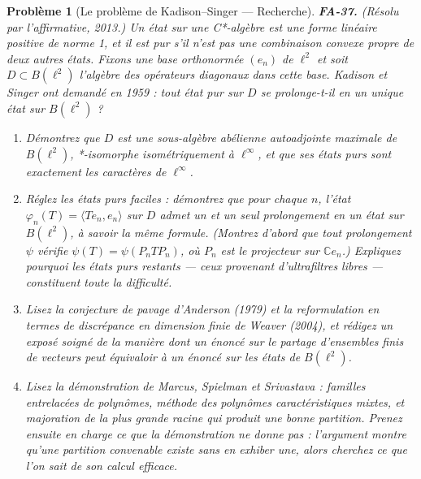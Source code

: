 \documentclass[11pt]{article}
\newtheorem{problem}{Problème}
\begin{document}
\bigskip

\begin{problem}[{Le problème de Kadison--Singer --- Recherche}]
\textbf{FA-37.} (Résolu par l'affirmative, 2013.) Un \textit{état} sur une C*-algèbre est une forme
linéaire positive de norme 1, et il est \textit{pur} s'il n'est pas une combinaison convexe propre de deux
autres états. Fixons une base orthonormée $ (e_n) $ de $ \ell^2 $ et soit $ D \subset B(\ell^2) $
l'algèbre des opérateurs diagonaux dans cette base. Kadison et Singer ont demandé en 1959 : tout état pur
sur $ D $ se prolonge-t-il en un \textit{unique} état sur $ B(\ell^2) $ ?
\begin{enumerate}
\item[(a)] Démontrez que $ D $ est une sous-algèbre abélienne autoadjointe maximale de $ B(\ell^2) $,
*-isomorphe isométriquement à $ \ell^\infty $, et que ses états purs sont exactement les caractères de
$ \ell^\infty $.
\item[(b)] Réglez les états purs faciles : démontrez que pour chaque $ n $, l'état
$ \varphi_n(T) = \langle Te_n, e_n \rangle $ sur $ D $ admet un et un seul prolongement en un état
sur $ B(\ell^2) $, à savoir la même formule. (Montrez d'abord que tout prolongement $ \psi $ vérifie
$ \psi(T) = \psi(P_nTP_n) $, où $ P_n $ est le projecteur sur $ \mathbb{C}e_n $.) Expliquez
pourquoi les états purs restants --- ceux provenant d'ultrafiltres libres --- constituent toute la
difficulté.
\item[(c)] Lisez la conjecture de pavage d'Anderson (1979) et la reformulation en termes de discrépance en
dimension finie de Weaver (2004), et rédigez un exposé soigné de la manière dont un énoncé sur le
partage d'ensembles finis de vecteurs peut équivaloir à un énoncé sur les états de
$ B(\ell^2) $.
\item[(d)] Lisez la démonstration de Marcus, Spielman et Srivastava : familles entrelacées de polynômes, méthode
des polynômes caractéristiques mixtes, et majoration de la plus grande racine qui produit une bonne
partition. Prenez ensuite en charge ce que la démonstration ne donne pas : l'argument montre qu'une
partition convenable existe sans en exhiber une, alors cherchez ce que l'on sait de son calcul
efficace.
\end{enumerate}

\end{problem}
\end{document}
